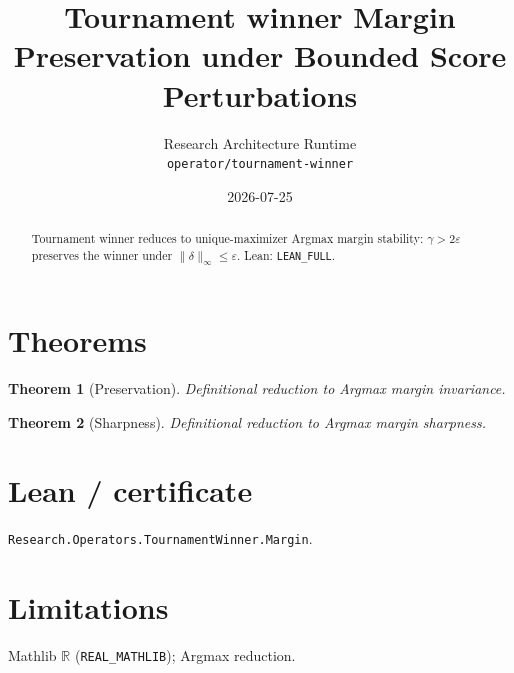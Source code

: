 \documentclass[11pt]{article}
\title{Tournament winner Margin Preservation under Bounded Score Perturbations}
\author{Research Architecture Runtime \\ \texttt{operator/tournament-winner}}
\date{2026-07-25}
\newtheorem{theorem}{Theorem}
\begin{document}
\maketitle
\begin{abstract}
Tournament winner reduces to unique-maximizer Argmax margin stability: $\gamma>2\varepsilon$
preserves the winner under $\|\delta\|_\infty\le\varepsilon$. Lean: \texttt{LEAN\_FULL}.
\end{abstract}
\section{Theorems}
\begin{theorem}[Preservation]
Definitional reduction to Argmax margin invariance.
\end{theorem}
\begin{theorem}[Sharpness]
Definitional reduction to Argmax margin sharpness.
\end{theorem}
\section{Lean / certificate}
\texttt{Research.Operators.TournamentWinner.Margin}.
\section{Limitations}
Mathlib $\mathbb{R}$ (\texttt{REAL\_MATHLIB}); Argmax reduction.
\end{document}
